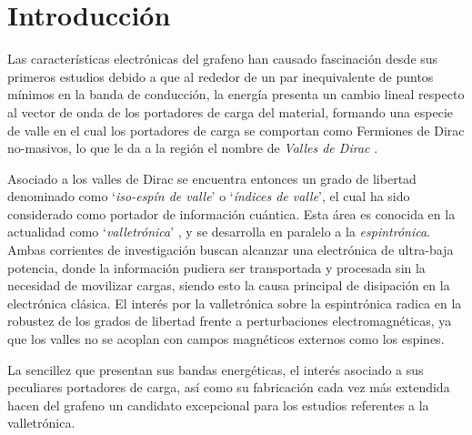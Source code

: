 \chapter{Introducción}


Las características electrónicas del grafeno han causado fascinación desde sus 
primeros estudios debido a que al rededor de un par inequivalente de puntos mínimos en la banda de conducción, la energía presenta un cambio lineal respecto al vector de onda de los portadores de carga del material, formando una especie de valle en el cual los portadores de carga se comportan como Fermiones de Dirac no-masivos, lo que le da a la región el nombre de \emph{Valles de Dirac} 
\autocite{DiVincenzo1984, Gorbar2002, Kopelevich2003}.

Asociado a los valles de Dirac se encuentra entonces un grado de libertad denominado como `\emph{iso-espín de valle}' o `\emph{índices de valle}', el cual ha sido considerado como portador de información cuántica. 
Esta área es conocida en la actualidad como `\emph{valletrónica}' \autocite{Schaibley2016}, y se desarrolla en paralelo a la \emph{espintrónica}.
Ambas corrientes de investigación buscan alcanzar una electrónica de ultra-baja potencia, donde la información pudiera ser transportada y procesada sin la necesidad de movilizar cargas, siendo esto la causa principal de disipación en la electrónica clásica. 
El interés por la valletrónica sobre la espintrónica radica en la robustez de los grados de libertad frente a perturbaciones electromagnéticas, ya que los valles no se acoplan con campos magnéticos externos como los espines.

La sencillez que presentan sus bandas energéticas, el interés asociado a sus peculiares portadores de carga, así como su fabricación cada vez más extendida hacen del grafeno un candidato excepcional para los estudios referentes a la valletrónica. 

